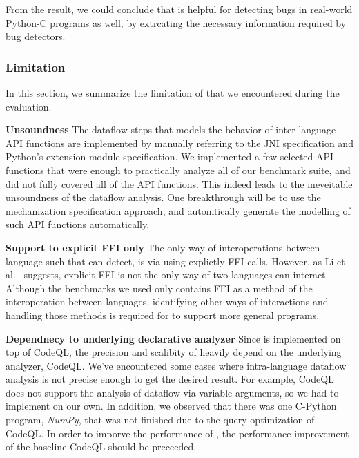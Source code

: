 {From the result, we could conclude that \ours is helpful for detecting bugs in
real-world Python-C programs as well, by extrcating the necessary information
required by bug detectors.

\subsubsection{Limitation}
In this section, we summarize the limitation of \ours that we encountered during the evaluation.

\textbf{Unsoundness} The dataflow steps that models the behavior of inter-language API functions
are implemented by manually referring to the JNI specification and Python's extension module specification.
We implemented a few selected API functions that were enough to practically analyze
all of our benchmark suite, and did not fully covered all of the API functions.
This indeed leads to the ineveitable unsoundness of the dataflow analysis.
One breakthrough will be to use the mechanization specification approach, and
automtically generate the modelling of such API functions automatically.

\textbf{Support to explicit FFI only}
The only way of interoperations between language such that \ours can detect, is via
using explictly FFI calls. However, as Li et al.~\cite{vulnerable-multi} suggests,
explicit FFI is not the only way of two languages can interact.
Although the benchmarks we used only contains FFI as a method of the interoperation between languages,
identifying other ways of interactions and handling those methods is required for \ours to support more general programs.

\textbf{Dependnecy to underlying declarative analyzer}
Since \ours is implemented on top of CodeQL, the precision and scalibity of \ours heavily depend on the
underlying analyzer, CodeQL. We've encountered some cases where intra-language dataflow analysis is
not precise enough to get the desired result. For example, CodeQL does not support the
analysis of dataflow via variable arguments, so we had to implement on our own.
In addition, we observed that there was one C-Python program, {\it NumPy}, that was not finished
due to the query optimization of CodeQL. 
In order to imporve the performance of \ours, the performance improvement of the
baseline CodeQL should be preceeded.
}
